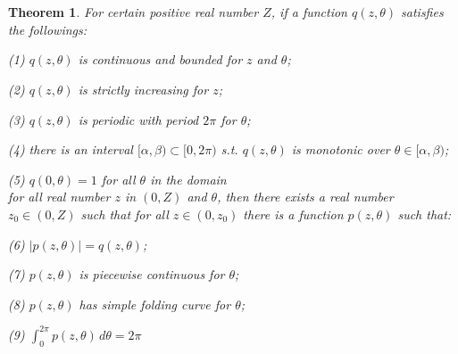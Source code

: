 \documentclass{kms-j}
\theoremstyle{plain}
\newtheorem{theorem}{Theorem}[section]
\theoremstyle{definition}
\theoremstyle{remark}
\begin{document}
\section{}
\begin{theorem}\label{pExists}
For certain positive real number $Z$, if a function $q(z,\theta)$ satisfies the followings:

{\rm (1)} $q(z,\theta)$ is continuous and bounded for $z$ and $\theta$;

{\rm (2)} $q(z,\theta)$ is strictly increasing for $z$;

{\rm (3)} $q(z,\theta)$ is periodic with period $2\pi$ for $\theta$;

{\rm (4)} there is an interval $[\alpha,\beta)\subset [0,2\pi)$ s.t. $q(z,\theta)$ is monotonic over $\theta\in[\alpha,\beta)$;

{\rm (5)} $q(0,\theta)=1$ for all $\theta$ in the domain
\\for all real number $z$ in $(0,Z)$ and $\theta$, then there exists a real number $z_0\in(0,Z)$ such that for all $z\in(0,z_0)$ there is a function $p(z,\theta)$ such that:

{\rm (6)} $|p(z,\theta)|=q(z,\theta)$;

{\rm (7)} $p(z,\theta)$ is piecewise continuous for $\theta$;

{\rm (8)} $p(z,\theta)$ has simple folding curve for $\theta$;

{\rm (9)} $\int_0^{2\pi} p(z,\theta)\,d\theta=2\pi$

\end{theorem}
\end{document}
